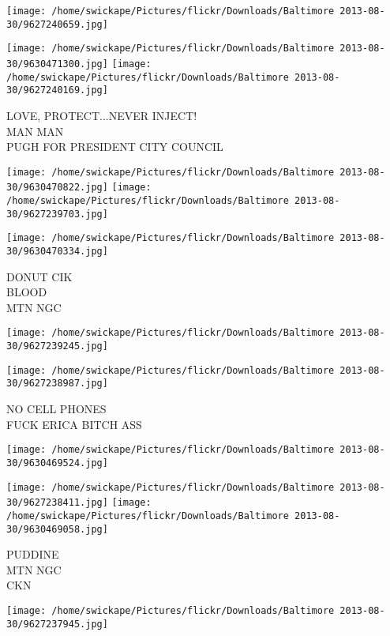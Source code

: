 \documentclass[10pt,letterpaper]{article}
\begin{document}
\texttt{[image: /home/swickape/Pictures/flickr/Downloads/Baltimore 2013-08-30/9627240659.jpg]}

\vspace{0.25in}
\texttt{[image: /home/swickape/Pictures/flickr/Downloads/Baltimore 2013-08-30/9630471300.jpg]}
\texttt{[image: /home/swickape/Pictures/flickr/Downloads/Baltimore 2013-08-30/9627240169.jpg]}

LOVE, PROTECT...NEVER INJECT!\\
MAN MAN\\
PUGH FOR PRESIDENT CITY COUNCIL\\
\pagebreak

\texttt{[image: /home/swickape/Pictures/flickr/Downloads/Baltimore 2013-08-30/9630470822.jpg]}
\texttt{[image: /home/swickape/Pictures/flickr/Downloads/Baltimore 2013-08-30/9627239703.jpg]}

\texttt{[image: /home/swickape/Pictures/flickr/Downloads/Baltimore 2013-08-30/9630470334.jpg]}

DONUT CIK\\
BLOOD\\
MTN NGC\\
\pagebreak

\texttt{[image: /home/swickape/Pictures/flickr/Downloads/Baltimore 2013-08-30/9627239245.jpg]}

\vspace{0.25in}
\texttt{[image: /home/swickape/Pictures/flickr/Downloads/Baltimore 2013-08-30/9627238987.jpg]}

NO CELL PHONES\\
FUCK ERICA BITCH ASS\\
\pagebreak

\texttt{[image: /home/swickape/Pictures/flickr/Downloads/Baltimore 2013-08-30/9630469524.jpg]}

\vspace{0.25in}
\texttt{[image: /home/swickape/Pictures/flickr/Downloads/Baltimore 2013-08-30/9627238411.jpg]}
\texttt{[image: /home/swickape/Pictures/flickr/Downloads/Baltimore 2013-08-30/9630469058.jpg]}

PUDDINE\\
MTN NGC\\
CKN\\
\pagebreak

\texttt{[image: /home/swickape/Pictures/flickr/Downloads/Baltimore 2013-08-30/9627237945.jpg]}
\end{document}

